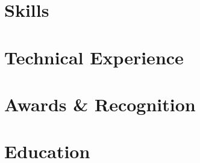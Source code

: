 \documentclass[10pt]{article}
\begin{document}
\pagestyle{others}\thispagestyle{first_page}



\section{Skills}


\section{Technical Experience}


\section{Awards \& Recognition}



\section{Education}

\end{document}
